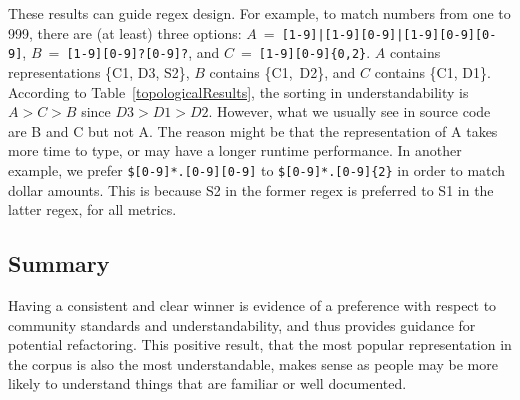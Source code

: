 These results can guide regex design.
For example, to match numbers from one to 999, there are (at least) three options: $A$~=~{\tt [1-9]|[1-9][0-9]|[1-9][0-9][0-9]}, $B$~=~{\tt [1-9][0-9]?[0-9]?}, and $C$~=~{\tt [1-9][0-9]\{0,2\}}.
$A$ contains representations \{C1, D3, S2\}, $B$ contains \{C1,~D2\}, and $C$ contains \{C1, D1\}. %
According to Table~\ref{topologicalResults}, the sorting in understandability is $A>C>B$ since $D3>D1>D2$. However, what we usually see in source code are B and C but not A. The reason might be that the representation of A takes more time to type, or may have a longer runtime performance.
In another example, we prefer {\tt \$[0-9]*.[0-9][0-9]} to {\tt \$[0-9]*.[0-9]\{2\}} in order to match dollar amounts. This is because S2 in the former regex is preferred to S1 in the latter regex, for all metrics.
%

\subsection{Summary}
Having a consistent and clear winner is evidence of a preference with respect to community standards and understandability, and thus provides guidance for potential refactoring.
This positive result, that the most popular representation in the corpus is also the most understandable, makes sense as people may be more likely to understand things that are familiar or well documented.
